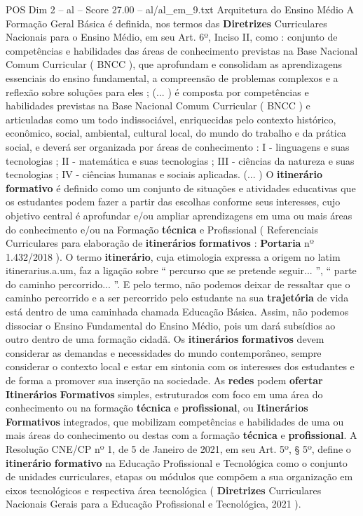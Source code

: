 \begin{textsample}{POS Dim 2 – al – Score 27.00 – al/al\_em\_9.txt}
Arquitetura do Ensino Médio A Formação Geral Básica é definida, nos termos das \textbf{Diretrizes} Curriculares Nacionais para o Ensino Médio, em seu Art. 6º, Inciso II, como : conjunto de competências e habilidades das áreas de conhecimento previstas na Base Nacional Comum Curricular ( BNCC ), que aprofundam e consolidam as aprendizagens essenciais do ensino fundamental, a compreensão de problemas complexos e a reflexão sobre soluções para eles ; (... ) é composta por competências e habilidades previstas na Base Nacional Comum Curricular ( BNCC ) e articuladas como um todo indissociável, enriquecidas pelo contexto histórico, econômico, social, ambiental, cultural local, do mundo do trabalho e da prática social, e deverá ser organizada por áreas de conhecimento : I - linguagens e suas tecnologias ; II - matemática e suas tecnologias ; III - ciências da natureza e suas tecnologias ; IV - ciências humanas e sociais aplicadas. (... ) O \textbf{itinerário} \textbf{formativo} é definido como um conjunto de situações e atividades educativas que os estudantes podem fazer a partir das escolhas conforme seus interesses, cujo objetivo central é aprofundar e/ou ampliar aprendizagens em uma ou mais áreas do conhecimento e/ou na Formação \textbf{técnica} e Profissional ( Referenciais Curriculares para elaboração de \textbf{itinerários} \textbf{formativos} : \textbf{Portaria} nº 1.432/2018 ).
O termo \textbf{itinerário}, cuja etimologia expressa a origem no latim itinerarius.a.um, faz a ligação sobre “ percurso que se pretende seguir... ”, “ parte do caminho percorrido... ”.
E pelo termo, não podemos deixar de ressaltar que o caminho percorrido e a ser percorrido pelo estudante na sua \textbf{trajetória} de vida está dentro de uma caminhada chamada Educação Básica.
Assim, não podemos dissociar o Ensino Fundamental do Ensino Médio, pois um dará subsídios ao outro dentro de uma formação cidadã.
Os \textbf{itinerários} \textbf{formativos} devem considerar as demandas e necessidades do mundo contemporâneo, sempre considerar o contexto local e estar em sintonia com os interesses dos estudantes e de forma a promover sua inserção na sociedade.
As \textbf{redes} podem \textbf{ofertar} \textbf{Itinerários} \textbf{Formativos} simples, estruturados com foco em uma área do conhecimento ou na formação \textbf{técnica} e \textbf{profissional}, ou \textbf{Itinerários} \textbf{Formativos} integrados, que mobilizam competências e habilidades de uma ou mais áreas do conhecimento ou destas com a formação \textbf{técnica} e \textbf{profissional}.
A Resolução CNE/CP nº 1, de 5 de Janeiro de 2021, em seu Art. 5º, § 5º, define o \textbf{itinerário} \textbf{formativo} na Educação Profissional e Tecnológica como o conjunto de unidades curriculares, etapas ou módulos que compõem a sua organização em eixos tecnológicos e respectiva área tecnológica ( \textbf{Diretrizes} Curriculares Nacionais Gerais para a Educação Profissional e Tecnológica, 2021 ).

\end{textsample}
